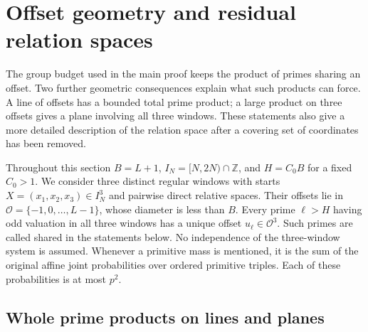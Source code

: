 \section{Offset geometry and residual relation spaces}
\label{p1:offset:section}

The group budget used in the main proof keeps the product of primes
sharing an offset. Two further geometric consequences explain what such
products can force. A line of offsets has a bounded total prime product;
a large product on three offsets gives a plane involving all three
windows. These statements also give a more detailed description of the
relation space after a covering set of coordinates has been removed.

Throughout this section $B=L+1$, $I_N=[N,2N)\cap\mathbb Z$, and
$H=C_0B$ for a fixed $C_0>1$. We consider three distinct regular windows
with starts $X=(x_1,x_2,x_3)\in I_N^3$ and pairwise direct relative
spaces. Their offsets lie in
$\mathcal O=\{-1,0,\ldots,L-1\}$, whose diameter is less than $B$.
Every prime $\ell>H$ having odd valuation in all three windows has a
unique offset $u_\ell\in\mathcal O^3$. Such primes are called shared
in the statements below. No independence of the three-window system
is assumed. Whenever a primitive mass is mentioned, it is the sum of
the original affine joint probabilities over ordered primitive triples.
Each of these probabilities is at most $p^2$.

\subsection{Whole prime products on lines and planes}

